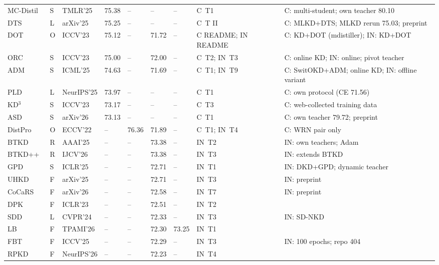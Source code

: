 {\begin{longtable}{@{}lllllll>{\raggedright\arraybackslash}p{1.5cm}>{\raggedright\arraybackslash}p{3.8cm}@{}}
MC-Distil~\citep{tambat2025mcdistil} & S & TMLR'25 & 75.38 & -- & -- & -- & C~T1 & C: multi-student; own teacher 80.10 \\
DTS~\citep{islam2025dts} & L & arXiv'25 & 75.25 & -- & -- & -- & C~T II & C: MLKD+DTS; MLKD rerun 75.03; preprint \\
DOT~\citep{zhao2023dot} & O & ICCV'23 & 75.12 & -- & 71.72 & -- & C README; IN README & C: KD+DOT (mdistiller); IN: KD+DOT \\
ORC~\citep{choi2023orc} & S & ICCV'23 & 75.00 & -- & 72.00 & -- & C~T2; IN~T3 & C: online KD; IN: online; pivot teacher \\
ADM~\citep{chen2025adm} & S & ICML'25 & 74.63 & -- & 71.69 & -- & C~T1; IN~T9 & C: SwitOKD+ADM; online KD; IN: offline variant \\
PLD~\citep{bassam2025pld} & L & NeurIPS'25 & 73.97 & -- & -- & -- & C~T1 & C: own protocol (CE 71.56) \\
KD$^3$~\citep{tang2023kd3} & S & ICCV'23 & 73.17 & -- & -- & -- & C~T3 & C: web-collected training data \\
ASD~\citep{raza2026asd} & S & arXiv'26 & 73.13 & -- & -- & -- & C~T1 & C: own teacher 79.72; preprint \\
DistPro~\citep{deng2022distpro} & O & ECCV'22 & -- & 76.36 & 71.89 & -- & C~T1; IN~T4 & C: WRN pair only \\
BTKD~\citep{zhang2025btkd} & R & AAAI'25 & -- & -- & 73.38 & -- & IN~T2 & IN: own teachers; Adam \\
BTKD++~\citep{zhang2026btkdpp} & R & IJCV'26 & -- & -- & 73.38 & -- & IN~T3 & IN: extends BTKD \\
GPD~\citep{guo2025gpd} & S & ICLR'25 & -- & -- & 72.71 & -- & IN~T1 & IN: DKD+GPD; dynamic teacher \\
UHKD~\citep{yu2025uhkd} & F & arXiv'25 & -- & -- & 72.71 & -- & IN~T3 & IN: preprint \\
CoCaRS~\citep{yu2026cocars} & F & arXiv'26 & -- & -- & 72.58 & -- & IN~T7 & IN: preprint \\
DPK~\citep{qiu2023dpk} & F & ICLR'23 & -- & -- & 72.51 & -- & IN~T2 &  \\
SDD~\citep{wei2024sdd} & L & CVPR'24 & -- & -- & 72.33 & -- & IN~T3 & IN: SD-NKD \\
LB~\citep{lin2026lb} & F & TPAMI'26 & -- & -- & 72.30 & 73.25 & IN~T1 &  \\
FBT~\citep{li2025fbt} & F & ICCV'25 & -- & -- & 72.29 & -- & IN~T3 & IN: 100 epochs; repo 404 \\
RPKD~\citep{etcibasi2026rpkd} & F & NeurIPS'26 & -- & -- & 72.23 & -- & IN~T4 &  \\

\end{longtable}}
